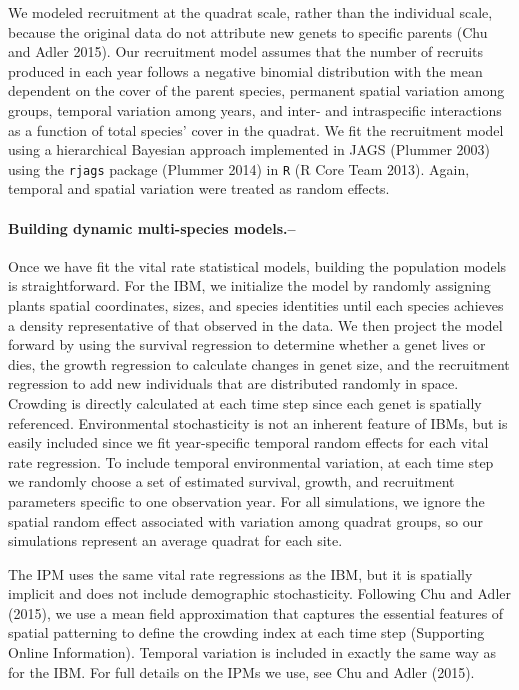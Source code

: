 \documentclass[12pt,]{article}
\begin{document}
We modeled recruitment at the quadrat scale, rather than the individual
scale, because the original data do not attribute new genets to specific
parents (Chu and Adler 2015). Our recruitment model assumes that the
number of recruits produced in each year follows a negative binomial
distribution with the mean dependent on the cover of the parent species,
permanent spatial variation among groups, temporal variation among
years, and inter- and intraspecific interactions as a function of total
species' cover in the quadrat. We fit the recruitment model using a
hierarchical Bayesian approach implemented in JAGS (Plummer 2003) using
the \texttt{rjags} package (Plummer 2014) in \texttt{R} (R Core Team 2013). Again,
temporal and spatial variation were treated as random effects.

\paragraph{Building dynamic multi-species
models.--}\label{building-dynamic-multi-species-models.}

Once we have fit the vital rate statistical models, building the
population models is straightforward. For the IBM, we initialize the
model by randomly assigning plants spatial coordinates, sizes, and
species identities until each species achieves a density representative
of that observed in the data. We then project the model forward by using
the survival regression to determine whether a genet lives or dies, the
growth regression to calculate changes in genet size, and the
recruitment regression to add new individuals that are distributed
randomly in space. Crowding is directly calculated at each time step
since each genet is spatially referenced. Environmental stochasticity is
not an inherent feature of IBMs, but is easily included since we fit
year-specific temporal random effects for each vital rate regression. To
include temporal environmental variation, at each time step we randomly
choose a set of estimated survival, growth, and recruitment parameters
specific to one observation year. For all simulations, we ignore the
spatial random effect associated with variation among quadrat groups, so
our simulations represent an average quadrat for each site.

The IPM uses the same vital rate regressions as the IBM, but it is
spatially implicit and does not include demographic stochasticity.
Following Chu and Adler (2015), we use a mean field approximation that
captures the essential features of spatial patterning to define the
crowding index at each time step (Supporting Online Information).
Temporal variation is included in exactly the same way as for the IBM.
For full details on the IPMs we use, see Chu and Adler (2015).
\end{document}
